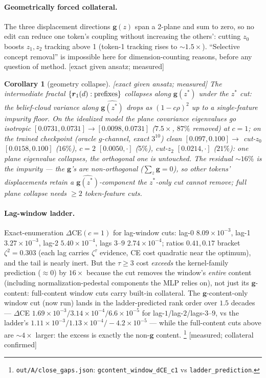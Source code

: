 \documentclass{article}
\newcommand{\gb}{\boldsymbol{g}}
\newcommand{\htag}[1]{{\normalfont\sffamily\footnotesize[#1]}}
\newtheorem{corollary}{Corollary}
\begin{document}
\paragraph{Geometrically forced collateral.} The three displacement directions
$\gb(z)$ span a 2-plane and sum to zero, so no edit can reduce one token's coupling
without increasing the others': cutting $z_0$ boosts $z_1,z_2$ tracking above 1
(token-1 tracking rises to ${\sim}1.5\times$). ``Selective concept removal'' is
impossible here for dimension-counting reasons, before any question of method.
\htag{exact given ansatz; measured}

\begin{corollary}[geometry collapse]\label{cor:geom}
\htag{exact given ansatz; measured} The intermediate fractal
$\{\boldsymbol{r}_1(d):\text{prefixes}\}$ collapses along $\gb(z^\ast)$ under the $z^\ast$ cut:
the belief-cloud variance along $\widehat{\gb(z^\ast)}$ drops as $(1-c\rho)^2$ up to a
single-feature impurity floor. On the idealized model the plane covariance eigenvalues
go isotropic $[0.0731,0.0731]\to[0.0098,0.0731]$ ($7.5\times$, $87\%$ removed) at
$c=1$; on the trained checkpoint (oracle $g$-channel, exact $3^{10}$) clean
$[0.097,0.100]\to$ cut-$z_0$ $[0.0158,0.100]$ ($16\%$), $c=2$ $[0.0050,\cdot]$ ($5\%$),
cut-$z_2$ $[0.0214,\cdot]$ ($21\%$): one plane eigenvalue collapses, the orthogonal
one is untouched. The residual $\sim\!16\%$ is the impurity --- the $\gb$'s are
non-orthogonal ($\sum_z\gb=0$), so other tokens' displacements retain a
$\widehat{\gb(z^\ast)}$-component the $z^\ast$-only cut cannot remove; full plane
collapse needs $\ge2$ token-feature cuts.
\end{corollary}

\paragraph{Lag-window ladder.} Exact-enumeration $\Delta$CE$(c=1)$ for lag-window
cuts: lag-0 $8.09\times10^{-3}$, lag-1 $3.27\times10^{-3}$, lag-2 $5.40\times10^{-4}$,
lags $3$--$9$ $2.74\times10^{-4}$; ratios $0.41,0.17$ bracket $\zeta^2=0.303$ (each
lag carries $\zeta^\tau$ evidence, CE cost quadratic near the optimum), and the tail
is nearly inert. But the $\tau\ge3$ cost \emph{exceeds} the kernel-family prediction
($\approx0$) by $16\times$ because the cut removes the window's \emph{entire} content
(including normalization-pedestal components the MLP relies on), not just its
$\gb$-content: full-content window cuts carry built-in collateral. The
$\gb$-content-only window cut (now run) lands in the ladder-predicted rank order over
$1.5$ decades --- $\Delta$CE $1.69\times10^{-3}/3.14\times10^{-4}/6.6\times10^{-5}$ for
lag-$1$/lag-$2$/lags-$3$--$9$, vs the ladder's
$1.11\times10^{-3}/1.13\times10^{-4}/{-}4.2\times10^{-5}$ --- while the full-content cuts
above are ${\sim}4\times$ larger: the excess is exactly the non-$\gb$ content.%
\footnote{\texttt{out/A/close\_gaps.json}: \texttt{gcontent\_window\_dCE\_c1} vs
\texttt{ladder\_prediction}.}
\htag{measured; collateral confirmed}
\end{document}
